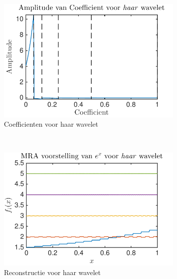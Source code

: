 \begin{figure}
    \centering
     \begin{subfigure}[b]{0.4\textwidth}
            \includegraphics[width=\textwidth]{../src/denoising/haar_noNoise/coef_exp_haar_4}
            \caption{Coefficienten voor haar wavelet}
            \label{fig:tiger}
        \end{subfigure}
        ~ %
        \begin{subfigure}[b]{0.4\textwidth}
            \includegraphics[width=\textwidth]{../src/denoising/haar_noNoise/MRA_exp_haar_4}
            \caption{Reconstructie voor haar wavelet}
            \label{fig:mouse}
        \end{subfigure}
    \begin{subfigure}[b]{0.4\textwidth}

\end{subfigure}
\end{figure}
